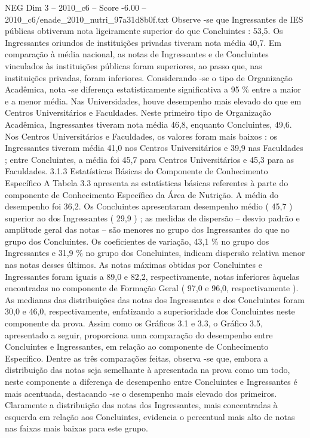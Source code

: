 \begin{textsample}{NEG Dim 3 – 2010\_c6 – Score -6.00 – 2010\_c6/enade\_2010\_nutri\_97a31d8b0f.txt}
Observe -se que Ingressantes de IES públicas obtiveram nota ligeiramente superior do que Concluintes : 53,5.
Os Ingressantes oriundos de instituições privadas tiveram nota média 40,7.
Em comparação à média nacional, as notas de Ingressantes e de Concluintes vinculados às instituições públicas foram superiores, ao passo que, nas instituições privadas, foram inferiores.
Considerando -se o tipo de Organização Acadêmica, nota -se diferença estatisticamente significativa a 95 \% entre a maior e a menor média.
Nas Universidades, houve desempenho mais elevado do que em Centros Universitários e Faculdades.
Neste primeiro tipo de Organização Acadêmica, Ingressantes tiveram nota média 46,8, enquanto Concluintes, 49,6.
Nos Centros Universitários e Faculdades, os valores foram mais baixos : os Ingressantes tiveram média 41,0 nos Centros Universitários e 39,9 nas Faculdades ; entre Concluintes, a média foi 45,7 para Centros Universitários e 45,3 para as Faculdades. 3.1.3 Estatísticas Básicas do Componente de Conhecimento Específico A Tabela 3.3 apresenta as estatísticas básicas referentes à parte do componente de Conhecimento Específico da Área de Nutrição.
A média do desempenho foi 36,2.
Os Concluintes apresentaram desempenho médio ( 45,7 ) superior ao dos Ingressantes ( 29,9 ) ; as medidas de dispersão – desvio padrão e amplitude geral das notas – são menores no grupo dos Ingressantes do que no grupo dos Concluintes.
Os coeficientes de variação, 43,1 \% no grupo dos Ingressantes e 31,9 \% no grupo dos Concluintes, indicam dispersão relativa menor nas notas desses últimos.
As notas máximas obtidas por Concluintes e Ingressantes foram iguais a 89,0 e 82,2, respectivamente, notas inferiores àquelas encontradas no componente de Formação Geral ( 97,0 e 96,0, respectivamente ).
As medianas das distribuições das notas dos Ingressantes e dos Concluintes foram 30,0 e 46,0, respectivamente, enfatizando a superioridade dos Concluintes neste componente da prova.
Assim como os Gráficos 3.1 e 3.3, o Gráfico 3.5, apresentado a seguir, proporciona uma comparação do desempenho entre Concluintes e Ingressantes, em relação ao componente de Conhecimento Específico.
Dentre as três comparações feitas, observa -se que, embora a distribuição das notas seja semelhante à apresentada na prova como um todo, neste componente a diferença de desempenho entre Concluintes e Ingressantes é mais acentuada, destacando -se o desempenho mais elevado dos primeiros.
Claramente a distribuição das notas dos Ingressantes, mais concentradas à esquerda em relação aos Concluintes, evidencia o percentual mais alto de notas nas faixas mais baixas para este grupo.

\end{textsample}

